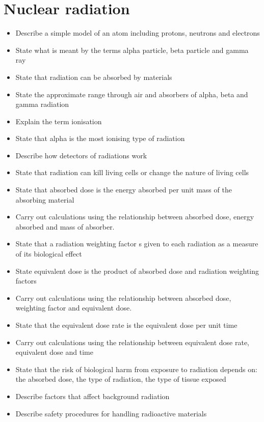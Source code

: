 \section{Nuclear radiation}
\begin{multicols}{2}
	\begin{itemize}
		\item Describe a simple model of an atom including protons, neutrons and
			electrons
		\item  State what is meant by the terms alpha particle, beta particle and
			gamma ray
		\item  State that radiation can be absorbed by materials
		\item State the approximate range through air and absorbers of alpha,
			beta and gamma radiation
		\item Explain the term ionisation
		\item State that alpha is the most ionising type of radiation
		\item Describe how detectors of radiations work
		\item State that radiation can kill living cells or change the nature of living
			cells
		\item State that absorbed dose is the energy absorbed per unit mass of the
			absorbing material
		\item Carry out calculations using the relationship between absorbed dose,
			energy absorbed and mass of absorber.
		\item State that a radiation weighting factor s given to each radiation as a
			measure of its biological effect
		\item State equivalent dose is the product of absorbed dose and radiation
			weighting factors
		\item Carry out calculations using the relationship between absorbed dose,
			weighting factor and equivalent dose.
		\item State that the equivalent dose rate is the equivalent dose per unit time
		\item Carry out calculations using the relationship between equivalent dose
			rate, equivalent dose and time
		\item State that the risk of biological harm from exposure to radiation
			depends on: the absorbed dose, the type of radiation, the type of
			tissue exposed
		\item Describe factors that affect background radiation
		\item Describe safety procedures for handling radioactive materials

\end{itemize}
\end{multicols}
